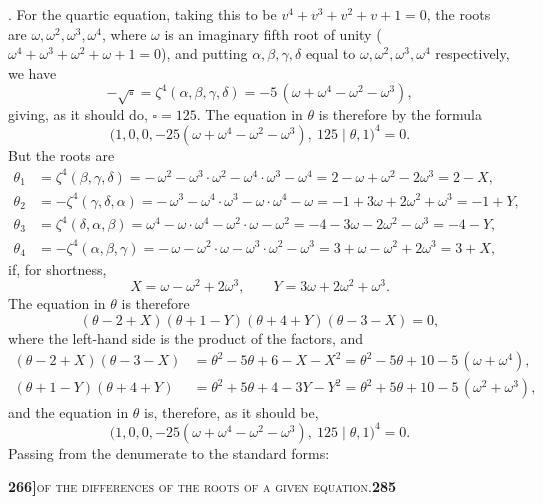 \documentclass[11pt]{article}
\newcommand{\Cdel}{\mid}
\begin{document}
. For the quartic equation, taking this to be $v^4 + v^3 + v^2 + v + 1 = 0$, the roots are $\omega, \omega^2, \omega^3, \omega^4$, where $\omega$ is an imaginary fifth root of unity ($\omega^4 + \omega^3 + \omega^2 + \omega + 1 = 0$), and putting $\alpha, \beta, \gamma, \delta$ equal to $\omega, \omega^2, \omega^3, \omega^4$ respectively, we have
\[
   -\sqrt{\square} = \zeta^4(\alpha, \beta, \gamma, \delta) = -5\,(\omega + \omega^4 - \omega^2 - \omega^3),
\]
giving, as it should do, $\square = 125$. The equation in $\theta$ is therefore by the formula
\[
   \bigl(1, 0, 0, -25(\omega + \omega^4 - \omega^2 - \omega^3),\ 125 \Cdel \theta, 1\bigr)^4 = 0.
\]
But the roots are
\[
\begin{aligned}
\theta_1 &= \zeta^4(\beta, \gamma, \delta) = -\,\omega^2 - \omega^3\cdot\omega^2 - \omega^4\cdot\omega^3 - \omega^4 = 2 - \omega + \omega^2 - 2\omega^3 = 2 - X,\\
\theta_2 &= -\zeta^4(\gamma, \delta, \alpha) = -\,\omega^3 - \omega^4\cdot\omega^3 - \omega\cdot\omega^4 - \omega = -1 + 3\omega + 2\omega^2 + \omega^3 = -1 + Y,\\
\theta_3 &= \zeta^4(\delta, \alpha, \beta) = \omega^4 - \omega\cdot\omega^4 - \omega^2\cdot\omega - \omega^2 = -4 - 3\omega - 2\omega^2 - \omega^3 = -4 - Y,\\
\theta_4 &= -\zeta^4(\alpha, \beta, \gamma) = -\,\omega - \omega^2\cdot\omega - \omega^3\cdot\omega^2 - \omega^3 = 3 + \omega - \omega^2 + 2\omega^3 = 3 + X,
\end{aligned}
\]
if, for shortness,
\[
   X = \omega - \omega^2 + 2\omega^3,\qquad Y = 3\omega + 2\omega^2 + \omega^3.
\]
The equation in $\theta$ is therefore
\[
   (\theta - 2 + X)(\theta + 1 - Y)(\theta + 4 + Y)(\theta - 3 - X) = 0,
\]
where the left-hand side is the product of the factors, and
\[
\begin{aligned}
   (\theta - 2 + X)(\theta - 3 - X) &= \theta^2 - 5\theta + 6 - X - X^2 = \theta^2 - 5\theta + 10 - 5\,(\omega + \omega^4),\\
   (\theta + 1 - Y)(\theta + 4 + Y) &= \theta^2 + 5\theta + 4 - 3Y - Y^2 = \theta^2 + 5\theta + 10 - 5\,(\omega^2 + \omega^3),
\end{aligned}
\]
and the equation in $\theta$ is, therefore, as it should be,
\[
   \bigl(1, 0, 0, -25(\omega + \omega^4 - \omega^2 - \omega^3),\ 125 \Cdel \theta, 1\bigr)^4 = 0.
\]
Passing from the denumerate to the standard forms:

\newpage
\setcounter{page}{285}

\noindent\textbf{266]}\hfill\textsc{of the differences of the roots of a given equation.}\hfill\textbf{285}
\end{document}
